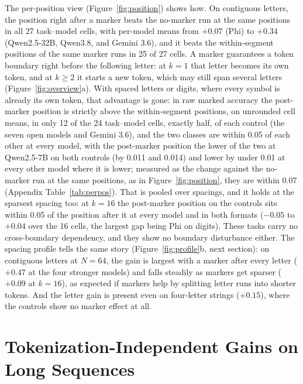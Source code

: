 \documentclass[10pt]{article} %
\begin{document}
The per-position view (Figure~\ref{fig:position}) shows how. On contiguous letters, the position right after a marker beats the no-marker run at the same positions in all 27 task--model cells, with per-model means from $+0.07$ (Phi) to $+0.34$ (Qwen2.5-32B, Qwen3.8, and Gemini 3.6), and it beats the within-segment positions of the same marker runs in 25 of 27 cells. A marker guarantees a token boundary right before the following letter: at $k = 1$ that letter becomes its own token, and at $k \ge 2$ it starts a new token, which may still span several letters (Figure~\ref{fig:overview}a). With spaced letters or digits, where every symbol is already its own token, that advantage is gone: in raw marked accuracy the post-marker position is strictly above the within-segment positions, on unrounded cell means, in only 12 of the 24 task--model cells, exactly half, of each control (the seven open models and Gemini 3.6), and the two classes are within 0.05 of each other at every model, with the post-marker position the lower of the two at Qwen2.5-7B on both controls (by 0.011 and 0.014) and lower by under 0.01 at every other model where it is lower; measured as the change against the no-marker run at the same positions, as in Figure~\ref{fig:position}, they are within 0.07 (Appendix Table~\ref{tab:perpos}). That is pooled over spacings, and it holds at the sparsest spacing too: at $k = 16$ the post-marker position on the controls sits within 0.05 of the position after it at every model and in both formats ($-0.05$ to $+0.04$ over the 16 cells, the largest gap being Phi on digits). These tasks carry no cross-boundary dependency, and they show no boundary disturbance either. The spacing profile tells the same story (Figure~\ref{fig:profile}b, next section): on contiguous letters at $N = 64$, the gain is largest with a marker after every letter ($+0.47$ at the four stronger models) and falls steadily as markers get sparser ($+0.09$ at $k = 16$), as expected if markers help by splitting letter runs into shorter tokens. And the letter gain is present even on four-letter strings ($+0.15$), where the controls show no marker effect at all.

\section{Tokenization-Independent Gains on Long Sequences}
\label{sec:segmentation}
\end{document}
